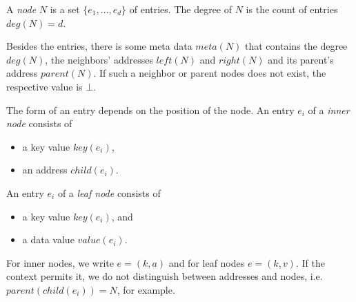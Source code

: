 \documentclass{vldb}
\begin{document}
\begin{defi}
A {\em node} $N$ is a set \mbox{$\{ e_1, \ldots, e_d \}$} of entries. 
The degree of $N$ is the count of entries \mbox{$deg(N) = d$}.

Besides the entries, there is some meta data $meta(N)$ that contains the
degree $deg(N)$, the neighbors' addresses $left(N)$ and $right(N)$ and its
parent's address $parent(N)$.
If such a neighbor or parent nodes does not exist, the respective value is
$\bot$.

The form of an entry depends on the position of the node.
An entry $e_i$ of a {\em inner node} consists of
\begin{itemize}
\item a key value $key(e_i)$,
\item an address $child(e_i)$.
\end{itemize}
An entry $e_i$ of a {\em leaf node} consists of
\begin{itemize}
\item a key value $key(e_i)$, and
\item a data value $value(e_i)$.
\end{itemize}
For inner nodes, we write \mbox{$e = (k, a)$} and for leaf nodes 
\mbox{$e = (k, v)$}.
If the context permits it, we do not distinguish between addresses and nodes,
i.e. \mbox{$parent(child(e_i)) = N$}, for example.
\end{defi}
\end{document}
